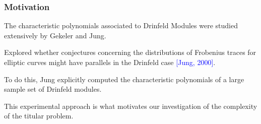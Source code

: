 \documentclass{beamer}
\newcommand{\blue}{\textcolor{blue}}
\begin{document}

\begin{frame}

\frametitle{Motivation}

\item The characteristic polynomials associated to Drinfeld Modules were studied extensively by Gekeler and Jung. 

\item Explored whether conjectures concerning the distributions of Frobenius traces for elliptic curves might have parallels in the Drinfeld case \blue{[Jung, 2000]}.

\item To do this, Jung explicitly computed the characteristic polynomials of a large sample set of Drinfeld modules.

\item This experimental approach is what motivates our investigation of the complexity of the titular problem.



    
\end{frame}

\end{document}
